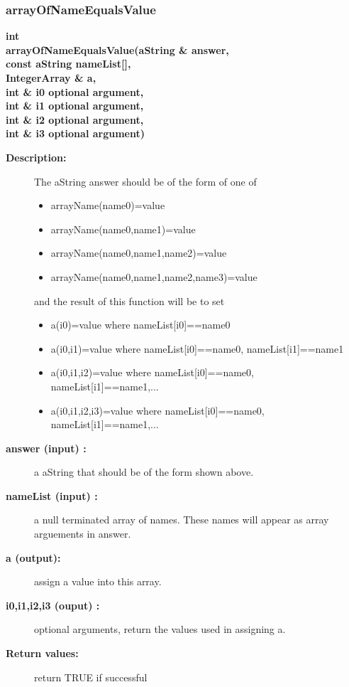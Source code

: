 \subsubsection{arrayOfNameEqualsValue}
 
\begin{flushleft} \textbf{%
int  \\ 
\settowidth{\NameListIncludeArgIndent}{arrayOfNameEqualsValue(}%
arrayOfNameEqualsValue(aString \& answer, \\ 
\hspace{\NameListIncludeArgIndent}const aString nameList[], \\ 
\hspace{\NameListIncludeArgIndent}IntegerArray \& a, \\ 
\hspace{\NameListIncludeArgIndent}int \& i0 optional argument,\\ 
\hspace{\NameListIncludeArgIndent}int \& i1 optional argument,\\ 
\hspace{\NameListIncludeArgIndent}int \& i2 optional argument,\\ 
\hspace{\NameListIncludeArgIndent}int \& i3   optional argument)
}\end{flushleft}
\begin{description}
\item[{\bf Description:}] 
    The aString answer should be of the form of one of
    \begin{itemize}
       \item arrayName(name0)=value
       \item arrayName(name0,name1)=value
       \item arrayName(name0,name1,name2)=value
       \item arrayName(name0,name1,name2,name3)=value
    \end{itemize}
   and the result of this function will be to set
    \begin{itemize}
       \item a(i0)=value where nameList[i0]==name0
       \item a(i0,i1)=value where nameList[i0]==name0, nameList[i1]==name1
       \item a(i0,i1,i2)=value where nameList[i0]==name0, nameList[i1]==name1,...
       \item a(i0,i1,i2,i3)=value where nameList[i0]==name0, nameList[i1]==name1,...
    \end{itemize}

    
\item[{\bf answer (input) :}]  a aString that should be of the form shown above.
\item[{\bf nameList (input) :}]  a null terminated array of names. These names will
    appear as array arguements in answer.
\item[{\bf a (output):}]  assign a value into this array.
\item[{\bf i0,i1,i2,i3 (ouput) :}]  optional arguments, return the values used in assigning a.
\item[{\bf Return values:}]  return TRUE if successful
\end{description}
